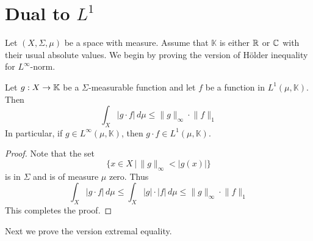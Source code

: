 \section{Dual to $L^1$}
\noindent
Let $(X,\Sigma,\mu)$ be a space with measure. Assume that $\mathbb{K}$ is either ${\mathbb R}$ or ${\mathbb C}$ with their usual absolute values. We begin by proving the version of H{\"o}lder inequality for $L^{\infty}$-norm.

\begin{proposition}\label{proposition:L_infinity_Holder}
  Let $g:X \rightarrow \mathbb{K}$ be a $\Sigma$-measurable function and let $f$ be a function in $L^1(\mu,\mathbb{K})$. Then 
  $$\int_X |g\cdot f|\,d\mu \leq \lVert g\rVert_{\infty} \cdot \lVert f\rVert_1$$
  In particular, if $g \in L^{\infty}(\mu,\mathbb{K})$, then $g\cdot f \in L^1(\mu,\mathbb{K})$.
\end{proposition}
\begin{proof}
  Note that the set
  $$\big\{x\in X\,\big|\,\lVert g \rVert_{\infty} < |g(x)|\big\}$$
  is in $\Sigma$ and is of measure $\mu$ zero. Thus
  $$\int_X |g\cdot f|\,d\mu \leq \int_X |g| \cdot |f|\,d\mu \leq \lVert g\rVert_{\infty} \cdot \lVert f\rVert_1$$
  This completes the proof.
\end{proof}
\noindent
Next we prove the version extremal equality.

